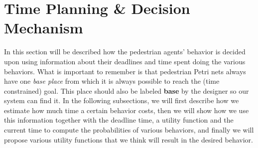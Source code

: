 \documentclass[11pt, a4paper]{book}
\begin{document}


\section{Time Planning \& Decision Mechanism}
\label{timeplanning}
In this section will be described how the pedestrian agents' behavior is decided upon using information about their deadlines and time spent doing the various behaviors.
What is important to remember is that pedestrian Petri nets always have one \emph{base place} from which it is always possible to reach the (time constrained) goal. This place should also be labeled \textbf{base} by the designer so our system can find it. In the following subsections, we will first describe how we estimate how much time a certain behavior costs, then we will show how we use this information together with the deadline time, a utility function and the current time to compute the probabilities of various behaviors, and finally we will propose various utility functions that we think will result in the desired behavior.
\end{document}
